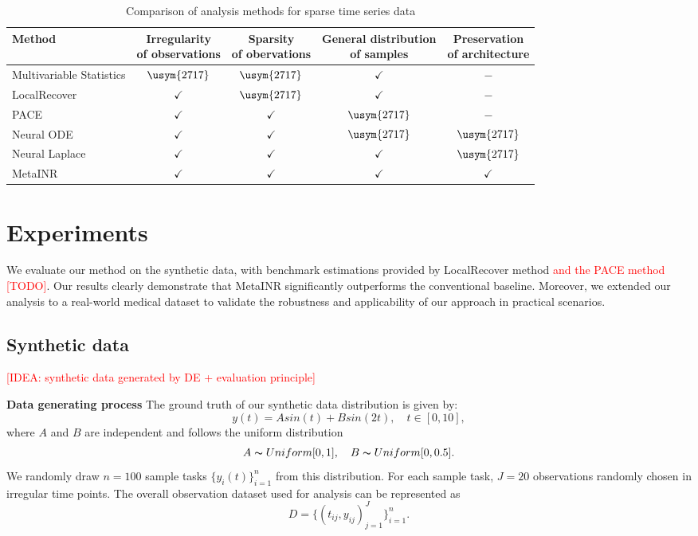 \documentclass{article}
\newcommand{\xmark}{\usym{2717}}
\begin{document}
\begin{table}[htb]
  \centering
\begin{tabular}{lcccc}
  \hline 
  Method & \thead{Irregularity\\of observations} & \thead{Sparsity \\of obervations} & \thead{General distribution \\ of samples} & \thead{Preservation \\ of architecture} \\
  \hline  
  Multivariable Statistics& $\xmark$ & $\xmark$ & $\checkmark$ & $-$\\
  LocalRecover & $\checkmark$ & $\xmark$ & $\checkmark$ & $-$\\
  PACE & $\checkmark$ & $\checkmark$ & $\xmark$& $-$  \\
  Neural ODE & $\checkmark$ & $\checkmark$ & $\xmark$ & $\xmark$ \\
  Neural Laplace & $\checkmark$ & $\checkmark$ & $\checkmark$ & $\xmark$ \\
  MetaINR & $\checkmark$ & $\checkmark$ &$\checkmark$ & $\checkmark$\\
 \hline
\end{tabular}
\caption{Comparison of analysis methods for sparse time series data}
\label{method_compare}
\end{table}




\section{Experiments}
We evaluate our method on the synthetic data, with benchmark estimations provided by LocalRecover method \textcolor{red}{and the PACE method [TODO]}.
Our results clearly demonstrate that MetaINR significantly outperforms the conventional baseline. 
Moreover, we extended our analysis to a real-world medical dataset to validate the robustness and applicability of our approach in practical scenarios.
\subsection{Synthetic data}

\textcolor{red}{[IDEA: synthetic data generated by DE + evaluation principle]}


\textbf{Data generating process}
The ground truth of our synthetic data distribution is given by:
$$
y(t)=A sin(t)+ B sin(2t), \quad t \in [0,10],
$$
where $A$ and $B$ are independent and follows the uniform distribution
$$
A \thicksim Uniform[0,1], \quad B \thicksim Uniform[0,0.5].
$$
We randomly draw $n=100$ sample tasks $\{y_i(t)\}_{i=1}^n$ from this distribution.
For each sample task, $J=20$ observations randomly chosen in irregular time points.
The overall observation dataset used for analysis can be represented as
$$
D=\{(t_{ij},y_{ij})_{j=1}^{J}\}_{i=1}^n.
$$
\end{document}
